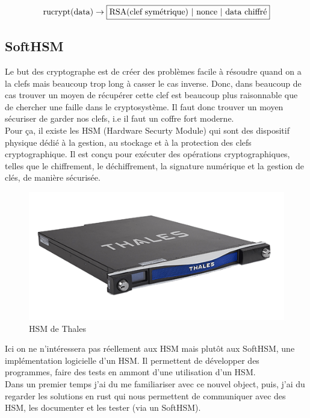 \documentclass[a4paper, 12pt]{article}
\begin{document}
$$
\text{rucrypt(data)} \rightarrow \fbox{RSA(clef symétrique) | nonce | data chiffré}
$$

\subsection{SoftHSM}

Le but des cryptographe est de créer des problèmes facile à résoudre quand on a la clefs mais beaucoup trop long à casser le cas inverse. Donc, dans beaucoup de cas trouver un moyen de récupérer cette clef est beaucoup plus raisonnable que de chercher une faille dans le cryptosystème. Il faut donc trouver un moyen sécuriser de garder nos clefs, i.e il faut un coffre fort moderne. \\

Pour ça, il existe les HSM (Hardware Securty Module) qui sont des dispositif physique dédié à la gestion, au stockage et à la protection des clefs cryptographique. Il est conçu pour exécuter des opérations cryptographiques, telles que le chiffrement, le déchiffrement, la signature numérique et la gestion de clés, de manière sécurisée.


\begin{figure}[h]
	\centering
	\includegraphics[width=.7\textwidth]{img/hsm.png}
	\caption{HSM de Thales}
	\label{hsmthales}
\end{figure}

Ici on ne n'intéressera pas réellement aux HSM mais plutôt aux SoftHSM, une implémentation logicielle d'un HSM. Il permettent de développer des programmes, faire des tests en ammont d'une utilisation d'un HSM. \\

Dans un premier temps j'ai du me familiariser avec ce nouvel object, puis, j'ai du regarder les solutions en rust qui nous permettent de communiquer avec des HSM, les documenter et les tester (via un SoftHSM). \\
\end{document}
